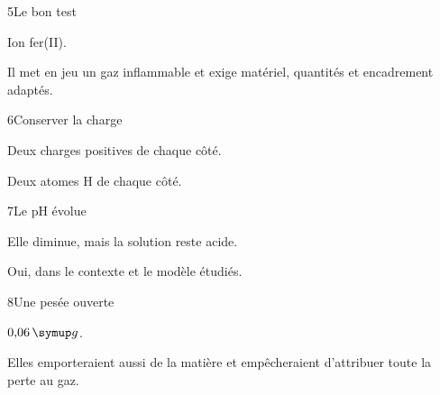 \par\noindent\begin{minipage}{\linewidth}
\begin{corrige}{5}{Le bon test}
\begin{questions}
\item Ion fer(II).
\item Il met en jeu un gaz inflammable et exige matériel, quantités et encadrement adaptés.
\end{questions}
\end{corrige}
\end{minipage}
\par\noindent\begin{minipage}{\linewidth}
\begin{corrige}{6}{Conserver la charge}
\begin{questions}
\item Deux charges positives de chaque côté.
\item Deux atomes H de chaque côté.
\end{questions}
\end{corrige}
\end{minipage}
\par\noindent\begin{minipage}{\linewidth}
\begin{corrige}{7}{Le pH évolue}
\begin{questions}
\item Elle diminue, mais la solution reste acide.
\item Oui, dans le contexte et le modèle étudiés.
\end{questions}
\end{corrige}
\end{minipage}
\par\noindent\begin{minipage}{\linewidth}
\begin{corrige}{8}{Une pesée ouverte}
\begin{questions}
\item $0{,}06\unite g$.
\item Elles emporteraient aussi de la matière et empêcheraient d’attribuer toute la perte au gaz.
\end{questions}
\end{corrige}
\end{minipage}

